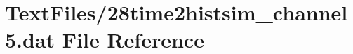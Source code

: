 \hypertarget{28time2histsim__channel5_8dat}{}\section{Text\+Files/28time2histsim\+\_\+channel5.dat File Reference}
\label{28time2histsim__channel5_8dat}
